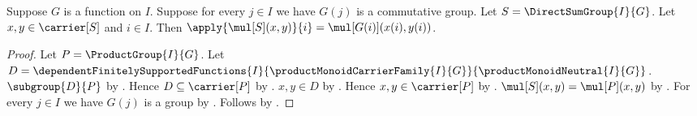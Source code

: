 \begin{proposition}\label{direct_sum_group_mul_coordinate}
    Suppose $G$ is a function on $I$.
    Suppose for every $j\in I$ we have $G(j)$ is a commutative group.
    Let $S=\DirectSumGroup{I}{G}$.
    Let $x,y\in\carrier[S]$ and $i\in I$.
    Then $\apply{\mul[S](x,y)}{i}=\mul[G(i)](x(i),y(i))$.
\end{proposition}
\begin{proof}
    Let $P=\ProductGroup{I}{G}$.
    Let $D=\dependentFinitelySupportedFunctions
        {I}{\productMonoidCarrierFamily{I}{G}}{
            \productMonoidNeutral{I}{G}}$.
    $\subgroup{D}{P}$ by .
    Hence $D\subseteq\carrier[P]$ by .
    $x,y\in D$ by .
    Hence $x,y\in\carrier[P]$ by .
    $\mul[S](x,y)=\mul[P](x,y)$ by
        .
    For every $j\in I$ we have $G(j)$ is a group by
        .
    Follows by .
\end{proof}

